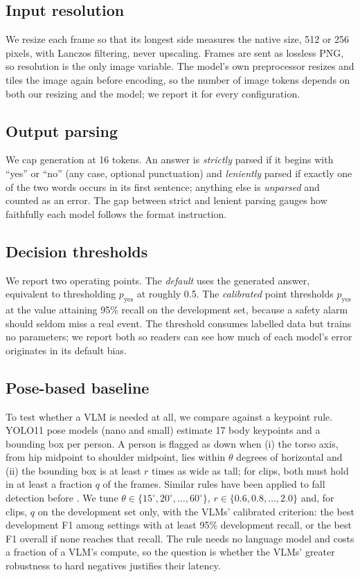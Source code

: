 \subsection{Input resolution}
\label{sec:resolution}
We resize each frame so that its longest side measures the native size, 512 or 256 pixels, with Lanczos filtering, never upscaling. Frames are sent as lossless PNG, so resolution is the only image variable. The model's own preprocessor resizes and tiles the image again before encoding, so the number of image tokens depends on both our resizing and the model; we report it for every configuration.

\subsection{Output parsing}
\label{sec:parsing}
We cap generation at 16 tokens. An answer is \textit{strictly} parsed if it begins with ``yes'' or ``no'' (any case, optional punctuation) and \textit{leniently} parsed if exactly one of the two words occurs in its first sentence; anything else is \textit{unparsed} and counted as an error. The gap between strict and lenient parsing gauges how faithfully each model follows the format instruction.

\subsection{Decision thresholds}
\label{sec:thresholds}
We report two operating points. The \textit{default} uses the generated answer, equivalent to thresholding $p_\text{yes}$ at roughly 0.5. The \textit{calibrated} point thresholds $p_\text{yes}$ at the value attaining 95\% recall on the development set, because a safety alarm should seldom miss a real event. The threshold consumes labelled data but trains no parameters; we report both so readers can see how much of each model's error originates in its default bias.

\subsection{Pose-based baseline}
\label{sec:baseline}
To test whether a VLM is needed at all, we compare against a keypoint rule. YOLO11 pose models \cite{maji2022yolopose,jocher2024yolo11} (nano and small) estimate 17 body keypoints and a bounding box per person. A person is flagged as down when (i) the torso axis, from hip midpoint to shoulder midpoint, lies within $\theta$ degrees of horizontal and (ii) the bounding box is at least $r$ times as wide as tall; for clips, both must hold in at least a fraction $q$ of the frames. Similar rules have been applied to fall detection before \cite{chen2020openposefall}. We tune $\theta \in \{15^\circ, 20^\circ, \dots, 60^\circ\}$, $r \in \{0.6, 0.8, \dots, 2.0\}$ and, for clips, $q$ on the development set only, with the VLMs' calibrated criterion: the best development F1 among settings with at least 95\% development recall, or the best F1 overall if none reaches that recall. The rule needs no language model and costs a fraction of a VLM's compute, so the question is whether the VLMs' greater robustness to hard negatives justifies their latency.

